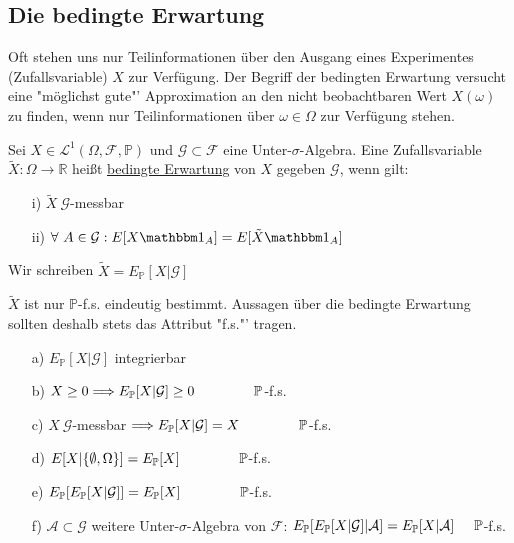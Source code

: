 \subsection{Die bedingte Erwartung}
Oft stehen uns nur Teilinformationen über den Ausgang eines Experimentes (Zufallsvariable) $ X $ zur Verfügung. Der Begriff der bedingten Erwartung versucht eine "möglichst gute"' Approximation an den nicht beobachtbaren Wert $ X(\omega) $ zu finden, wenn nur Teilinformationen über $ \omega\in\Omega $ zur Verfügung stehen.
\begin{Def}
Sei $ X\in\mathcal L^{1}(\Omega,\mathcal F,\mathbb P) $ und $ \mathcal G\subset\mathcal F $ eine Unter-$ \sigma $-Algebra. Eine Zufallsvariable $ \tilde X:\Omega\to\mathbb R $ heißt \underline{bedingte Erwartung} von $ X $ gegeben $ \mathcal G $, wenn gilt:
\begin{itemize}
\item[i)] $ \tilde X \ \mathcal G $-messbar
\item[ii)] $ \forall \ A\in\mathcal G: E[X\mathbbm 1_{A}]=E[\tilde X\mathbbm 1_{A}] $
\end{itemize}
Wir schreiben $ \tilde X=E_{\mathbb P}[X|\mathcal G] $
\end{Def}
\begin{rem}
$ \tilde X $ ist nur $ \mathbb P $-f.s. eindeutig bestimmt. Aussagen über die bedingte Erwartung sollten deshalb stets das Attribut "f.s."' tragen.
\end{rem}
\begin{lem}
\begin{enumerate} 
\item[a)] $ E_{\mathbb P}[X|\mathcal G] $ integrierbar
\item[b)] $ X\geq 0 \Longrightarrow E_{\mathbb P}[X|\mathcal G]\geq 0 \hspace*{1.5cm}\mathbb P$-f.s.
\item[c)] $ X \ \mathcal G $-messbar $ \Longrightarrow E_{\mathbb P}[X|\mathcal G]=X \hspace*{1.5cm}\mathbb P$-f.s.
\item[d)] $ E[X|\{\emptyset,\Omega\}]=E_{\mathbb P}[X] \hspace*{1.5cm}\mathbb{P}$-f.s.
\item[e)] $ E_{\mathbb P}[E_{\mathbb P}[X|\mathcal G]]=E_{\mathbb P}[X] \hspace*{1.5cm}\mathbb P$-f.s.
\item[f)] $ \mathcal A\subset\mathcal G $ weitere Unter-$ \sigma $-Algebra von $ \mathcal F $: $ E_{\mathbb P}[E_{\mathbb P}[X|\mathcal G]|\mathcal A]=E_{\mathbb P}[X|\mathcal A] \hspace*{0.5cm}\mathbb{P} $-f.s.
\begin{hwork}[Beweis]
\end{hwork}
\end{enumerate}
\end{lem}
